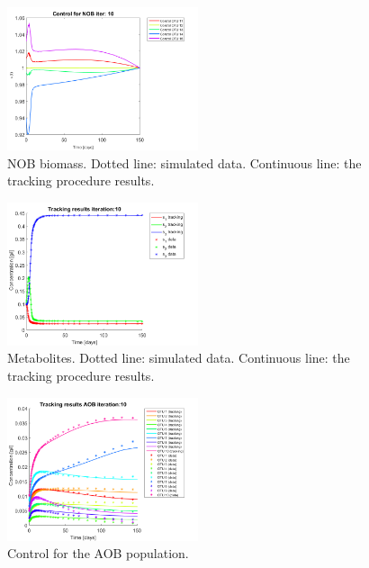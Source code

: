 \documentclass[3p,times]{elsarticle}
\begin{document}
\begin{figure}[h]
	\centering
	\includegraphics[width=0.5\textwidth]{Synthetic_data//lambda_=_e-2//191210_no_noise_2_Control_NOB_iter_10_plot_1}
	\caption{NOB biomass. Dotted line: simulated data. Continuous line: the tracking procedure results.}
	\label{NOB no noise e2}
\end{figure}
\begin{figure}[h]
	\centering
	\includegraphics[width=0.5\textwidth]{Synthetic_data//lambda_=_e-2//191210_no_noise_2_metabolites_iter_10}
	\caption{Metabolites. Dotted line: simulated data. Continuous line: the tracking procedure results.}
	\label{Metabolites no noise e2}
\end{figure}

\begin{figure}[h]
	\centering
	\includegraphics[width=0.5\textwidth]{Synthetic_data//lambda_=_e-2//191210_no_noise_2_AOB_iter_10_plot_1}
	\caption{Control for the AOB population.}
	\label{Control AOB no noise e2}
\end{figure}
\end{document}
